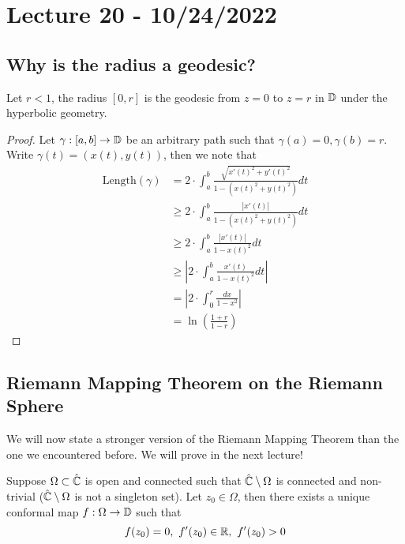 \section{Lecture 20 - 10/24/2022}

\subsection{Why is the radius a geodesic?}

\begin{proposition}
    Let $r < 1$, the radius $[0, r]$ is the geodesic from $z = 0$ to $z = r$ in $\mathbb{D}$ under the hyperbolic geometry.
\end{proposition}

\begin{proof}
     Let $\gamma: [a, b] \to \mathbb{D}$ be an arbitrary path such that $\gamma(a) = 0, \gamma(b) = r$. Write $\gamma(t) = (x(t), y(t))$, then we note that
     \begin{align*}
         \text{Length}(\gamma) &= 2 \cdot \int_a^b \frac{\sqrt{x'(t)^2 + y'(t)^2}}{1 - (x(t)^2 + y(t)^2)} dt\\
         &\geq 2 \cdot \int_a^b \frac{|x'(t)|}{1 - (x(t)^2 + y(t)^2)} dt\\
         &\geq 2 \cdot \int_a^b \frac{|x'(t)|}{1 - x(t)^2} dt \tag*{Since $x(t)^2 + y(t)^2 < 1$, denominator is larger here}\\
         &\geq |2 \cdot \int_a^b \frac{x'(t)}{1 - x(t)^2} dt|\\
         &= |2 \cdot \int_0^r \frac{dx}{1 - x^2}| \tag*{$x = x(t), dx = x'(t) dt$}\\
         &= \ln(\frac{1 + r}{1 - r})
     \end{align*}
\end{proof}

\subsection{Riemann Mapping Theorem on the Riemann Sphere}

We will now state a stronger version of the Riemann Mapping Theorem than the one we encountered before. We will prove in the next lecture!

\begin{theorem}
    Suppose $\Omega \subset \hat{\mathbb{C}}$ is open and connected such that $\hat{\mathbb{C}} \setminus \Omega$ is connected and non-trivial ($\hat{\mathbb{C}} \setminus \Omega$ is not a singleton set). Let $z_0 \in \Omega$, then there exists a unique conformal map $f: \Omega \to \mathbb{D}$ such that
    \[f(z_0) = 0,\ f'(z_0) \in \mathbb{R},\ f'(z_0) > 0\]
\end{theorem}

